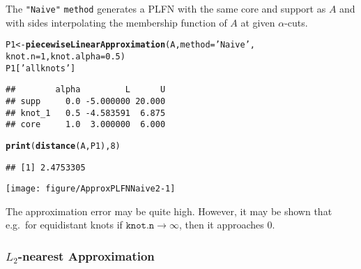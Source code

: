 \documentclass[11pt]{article}\usepackage[]{graphicx}\usepackage[]{color}
\makeatletter
\newcommand{\hlnum}[1]{\textcolor[rgb]{0.686,0.059,0.569}{#1}}%
\newcommand{\hlstr}[1]{\textcolor[rgb]{0.192,0.494,0.8}{#1}}%
\newcommand{\hlstd}[1]{\textcolor[rgb]{0.345,0.345,0.345}{#1}}%
\newcommand{\hlkwb}[1]{\textcolor[rgb]{0.69,0.353,0.396}{#1}}%
\newcommand{\hlkwc}[1]{\textcolor[rgb]{0.333,0.667,0.333}{#1}}%
\newcommand{\hlkwd}[1]{\textcolor[rgb]{0.737,0.353,0.396}{\textbf{#1}}}%
\newenvironment{kframe}{%
 \def\at@end@of@kframe{}%
 \ifinner\ifhmode%
  \def\at@end@of@kframe{\end{minipage}}%
  \begin{minipage}{\columnwidth}%
 \fi\fi%
 \def\FrameCommand##1{\hskip\@totalleftmargin \hskip-\fboxsep
 \colorbox{shadecolor}{##1}\hskip-\fboxsep
     \hskip-\linewidth \hskip-\@totalleftmargin \hskip\columnwidth}%
 \MakeFramed {\advance\hsize-\width
   \@totalleftmargin\z@ \linewidth\hsize
   \@setminipage}}%
 {\par\unskip\endMakeFramed%
 \at@end@of@kframe}
\newenvironment{knitrout}{}{} %
\newcommand{\argument}[1]{\texttt{\hlkwc{#1}}}
\newcommand{\str}[1]{\texttt{\hlstr{#1}}}
\makeatother
\begin{document}
The \str{"{}Naive"{}} \argument{method} generates a PLFN with the same
core and support as $A$ and with sides interpolating the membership function
of $A$ at given $\alpha$-cuts.

\begin{knitrout}\small
{}\color{fgcolor}\begin{kframe}
\begin{alltt}
\hlstd{P1} \hlkwb{<-} \hlkwd{piecewiseLinearApproximation}\hlstd{(A,} \hlkwc{method}\hlstd{=}\hlstr{'Naive'}\hlstd{,}
         \hlkwc{knot.n}\hlstd{=}\hlnum{1}\hlstd{,} \hlkwc{knot.alpha}\hlstd{=}\hlnum{0.5}\hlstd{)}
\hlstd{P1[}\hlstr{'allknots'}\hlstd{]}
\end{alltt}
\begin{verbatim}
##        alpha         L      U
## supp     0.0 -5.000000 20.000
## knot_1   0.5 -4.583591  6.875
## core     1.0  3.000000  6.000
\end{verbatim}
\begin{alltt}
\hlkwd{print}\hlstd{(}\hlkwd{distance}\hlstd{(A, P1),} \hlnum{8}\hlstd{)}
\end{alltt}
\begin{verbatim}
## [1] 2.4753305
\end{verbatim}
\end{kframe}
\end{knitrout}

\begin{center}
\begin{knitrout}\small
{}\color{fgcolor}

{\centering \texttt{[image: figure/ApproxPLFNNaive2-1]} 

}



\end{knitrout}
\end{center}

\noindent
The approximation error may be quite high.
However, it may be shown that e.g.~for equidistant knots if
$\mathtt{knot.n}\to\infty$,
then it approaches $0$.

\subsubsection{$L_2$-nearest Approximation}

\end{document}
